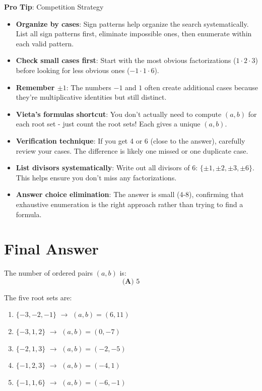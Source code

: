 \documentclass[12pt]{article}
\begin{document}
\begin{tipbox}
\textbf{Pro Tip}: Competition Strategy

\begin{itemize}
    \item \textbf{Organize by cases}: Sign patterns help organize the search systematically. List all sign patterns first, eliminate impossible ones, then enumerate within each valid pattern.
    
    \item \textbf{Check small cases first}: Start with the most obvious factorizations ($1 \cdot 2 \cdot 3$) before looking for less obvious ones ($-1 \cdot 1 \cdot 6$).
    
    \item \textbf{Remember $\pm 1$}: The numbers $-1$ and $1$ often create additional cases because they're multiplicative identities but still distinct.
    
    \item \textbf{Vieta's formulas shortcut}: You don't actually need to compute $(a,b)$ for each root set - just count the root sets! Each gives a unique $(a,b)$.
    
    \item \textbf{Verification technique}: If you get 4 or 6 (close to the answer), carefully review your cases. The difference is likely one missed or one duplicate case.
    
    \item \textbf{List divisors systematically}: Write out all divisors of 6: $\{\pm 1, \pm 2, \pm 3, \pm 6\}$. This helps ensure you don't miss any factorizations.
    
    \item \textbf{Answer choice elimination}: The answer is small (4-8), confirming that exhaustive enumeration is the right approach rather than trying to find a formula.
\end{itemize}
\end{tipbox}

\section*{Final Answer}

The number of ordered pairs $(a,b)$ is:
$$\boxed{\textbf{(A) } 5}$$

The five root sets are:
\begin{enumerate}
    \item $\{-3, -2, -1\}$ $\to$ $(a,b) = (6, 11)$
    \item $\{-3, 1, 2\}$ $\to$ $(a,b) = (0, -7)$
    \item $\{-2, 1, 3\}$ $\to$ $(a,b) = (-2, -5)$
    \item $\{-1, 2, 3\}$ $\to$ $(a,b) = (-4, 1)$
    \item $\{-1, 1, 6\}$ $\to$ $(a,b) = (-6, -1)$
\end{enumerate}
\end{document}
